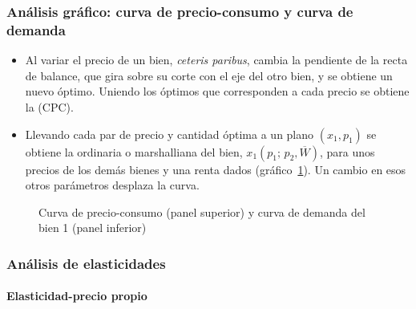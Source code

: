 \documentclass[11pt]{article}
\begin{document}
\subsubsection{Análisis gráfico: curva de precio-consumo y curva de demanda}\label{sec:analisis-grafico-curva-precio}

\begin{itemize}
\item Al variar el precio de un bien, \emph{ceteris paribus}, cambia la pendiente de la recta de balance, que gira sobre su corte con el eje del otro bien, y se obtiene un nuevo óptimo. Uniendo los óptimos que corresponden a cada precio se obtiene la  (CPC).
\item Llevando cada par de precio y cantidad óptima a un plano $(x_1,p_1)$ se obtiene la  ordinaria o marshalliana del bien, $x_1(p_1;\,p_2,\overline{W})$, para unos precios de los demás bienes y una renta dados (gráfico~\ref{fig:precio-consumo-demanda}). Un cambio en esos otros parámetros desplaza la curva.
\end{itemize}

\begin{figure}[H]
\centering
\caption{Curva de precio-consumo (panel superior) y curva de demanda del bien 1 (panel inferior)}\label{fig:precio-consumo-demanda}
\end{figure}

\subsubsection{Análisis de elasticidades}\label{sec:analisis-elasticidades}

\paragraph{Elasticidad-precio propio}
\end{document}
